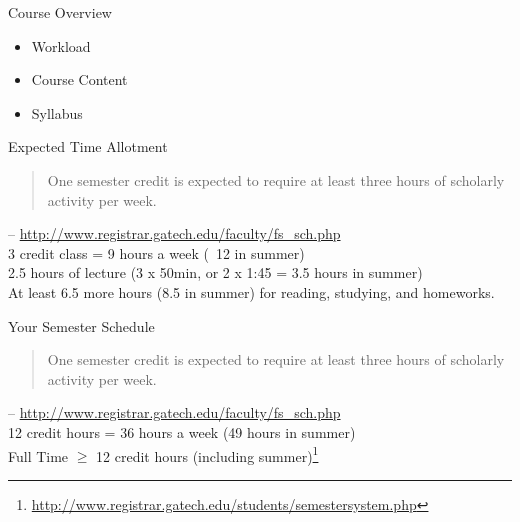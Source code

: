 \documentclass{beamer}
\author[Chris Simpkins]
{Christopher Simpkins \\\texttt{chris.simpkins@gatech.edu}}
\institute[Georgia Tech] %
\date[CS 2340]{}
\begin{document}
\begin{frame}
  \titlepage
\end{frame}

\begin{frame}[fragile]{Course Overview}

\begin{itemize}
\item Workload
\item Course Content
\item Syllabus
\end{itemize}

\end{frame}


\begin{frame}[fragile]{Expected Time Allotment}

\begin{quote}
One semester credit is expected to require at least three hours of scholarly activity per week.
\end{quote}
 -- \url{http://www.registrar.gatech.edu/faculty/fs_sch.php}\\
\vspace{.1in}
3 credit class = 9 hours a week (~12 in summer)\\
\vspace{.1in}
2.5 hours of lecture (3 x 50min, or 2 x 1:45 = 3.5 hours in summer)\\
\vspace{.1in}
At least 6.5 more hours (8.5 in summer) for reading, studying, and homeworks.

\end{frame}

\begin{frame}[fragile]{Your Semester Schedule}


\begin{quote}
One semester credit is expected to require at least three hours of scholarly activity per week.
\end{quote}
 -- \url{http://www.registrar.gatech.edu/faculty/fs_sch.php}\\
\vspace{.1in}
12 credit hours = 36 hours a week (49 hours in summer)\\
\vspace{.1in}
Full Time $\ge$ 12 credit hours (including summer)\footnote{\url{http://www.registrar.gatech.edu/students/semestersystem.php}}


\end{frame}
\end{document}
